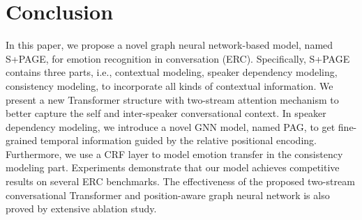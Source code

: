 \documentclass[letterpaper]{article} \usepackage{aaai22}  \usepackage{times}  \usepackage{helvet}  \usepackage{courier}  \usepackage[hyphens]{url}  \usepackage{graphicx} \urlstyle{rm} \def\UrlFont{\rm}  \usepackage{natbib}  \usepackage{caption} \DeclareCaptionStyle{ruled}{labelfont=normalfont,labelsep=colon,strut=off} \frenchspacing  \setlength{\pdfpagewidth}{8.5in}  \setlength{\pdfpageheight}{11in}  \usepackage{algorithm}
\begin{document}
\section{Conclusion}
In this paper, we propose a novel graph neural network-based model, named S+PAGE, for emotion recognition in conversation (ERC). Specifically, S+PAGE contains three parts, i.e., contextual modeling, speaker dependency modeling, consistency modeling, to incorporate all kinds of contextual information. We present a new Transformer structure with two-stream attention mechanism to better capture the self and inter-speaker conversational context. In speaker dependency modeling, we introduce a novel GNN model, named PAG, to get fine-grained temporal information guided by the relative positional encoding. Furthermore, we use a CRF layer to model emotion transfer in the consistency modeling part. Experiments demonstrate that our model achieves competitive results on several ERC benchmarks. The effectiveness of the proposed two-stream conversational Transformer and position-aware graph neural network is also proved by extensive ablation study.


\end{document}

